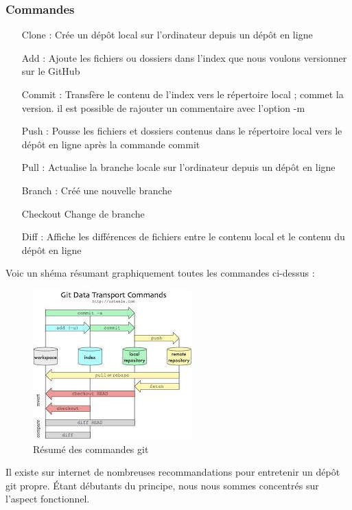\subsubsection{Commandes}

\begin{itemize}
    \item[Clone : ] Crée un dépôt local sur l’ordinateur depuis un dépôt en ligne
    \item[Add : ] Ajoute les fichiers ou dossiers dans l’index que nous voulons versionner sur le
    GitHub
    \item[Commit : ] Transfère le contenu de l’index vers le répertoire local ; commet la version. il est
    possible de rajouter un commentaire avec l’option -m
    \item[Push : ] Pousse les fichiers et dossiers contenus dans le répertoire local vers le dépôt en
    ligne après la commande commit
    \item[Pull : ] Actualise la branche locale sur l’ordinateur depuis un dépôt en ligne
    \item[Branch : ] Créé une nouvelle branche
    \item[Checkout ] Change de branche
    \item[Diff : ] Affiche les différences de fichiers entre le contenu local et le contenu du dépôt en
    ligne
\end{itemize}

Voic un shéma résumant graphiquement toutes les commandes ci-dessus :

\begin{figure}[!htb]
    \centering
    \includegraphics[trim={0cm 0cm 0cm 0cm},clip,scale=0.8]{Figures/git.png}
    \decoRule
    \caption{Résumé des commandes git} \label{fig:git}
\end{figure}

Il existe sur internet de nombreuses recommandations pour entretenir un dépôt git propre.
Étant débutants du principe, nous nous sommes concentrés sur l’aspect fonctionnel.

